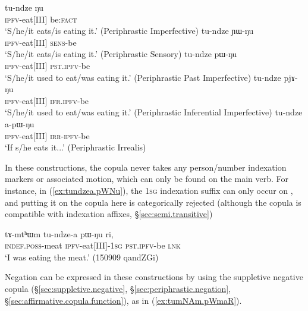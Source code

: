 \begin{exe}
\ex \label{ex:tundze.periphrastic}
\begin{xlist}
\ex \label{ex:tundze.Nu}
\gll tu-ndze ŋu \\
\textsc{ipfv}-eat[III] be:\textsc{fact} \\
\glt `S/he/it eats/is eating it.' (Periphrastic Imperfective)
\ex \label{ex:tundze.YWNu}
\gll tu-ndze ɲɯ-ŋu \\
\textsc{ipfv}-eat[III] \textsc{sens}-be  \\
\glt `S/he/it eats/is eating it.' (Periphrastic Sensory)
\ex \label{ex:tundze.pWNu}
\gll tu-ndze pɯ-ŋu \\
\textsc{ipfv}-eat[III] \textsc{pst}.\textsc{ipfv}-be  \\
\glt `S/he/it used to eat/was eating it.' (Periphrastic Past Imperfective)
\ex \label{ex:tundze.pjANu}
\gll tu-ndze pjɤ-ŋu \\
\textsc{ipfv}-eat[III] \textsc{ifr}.\textsc{ipfv}-be  \\
\glt `S/he/it used to eat/was eating it.' (Periphrastic Inferential Imperfective)
\ex \label{ex:tundze.apWNu}
\gll tu-ndze a-pɯ-ŋu \\
\textsc{ipfv}-eat[III] \textsc{irr}-\textsc{ipfv}-be  \\
\glt `If s/he eats it...' (Periphrastic Irrealis)
\end{xlist}
\end{exe}

In these constructions, the copula never takes any person/number indexation markers or associated motion, which can only be found on the main verb. For instance, in (\ref{ex:tundzea.pWNu}), the \textsc{1sg} indexation suffix  can only occur on , and putting it on the copula  here is categorically rejected (although the copula  is compatible with indexation affixes, §\ref{sec:semi.transitive})

\begin{exe}
\ex \label{ex:tundzea.pWNu}
\gll  tɤ-mtʰɯm tu-ndze-a pɯ-ŋu ri, \\
\textsc{indef}.\textsc{poss}-meat \textsc{ipfv}-eat[III]-\textsc{1sg} \textsc{pst}.\textsc{ipfv}-be \textsc{lnk} \\
\glt `I was eating the meat.' (150909 qandZGi)
\end{exe}

Negation can be expressed in these constructions by using the suppletive negative copula  (§\ref{sec:suppletive.negative}, §\ref{sec:periphrastic.negation}, §\ref{sec:affirmative.copula.function}), as in (\ref{ex:tumNAm.pWmaR}).


